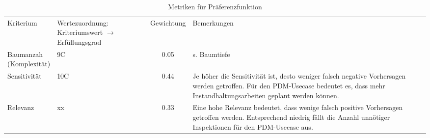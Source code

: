 \begin{table}[ht]
	\raggedright
	\begin{tabularx}{\textwidth}{ | l | l | c | X|}
		\hline
		Kriterium & \thead{Wertezuordnung:\\Kriteriumswert\\ $\rightarrow$ Erfüllungsgrad} & Gewichtung & Bemerkungen \\ 
		\thead{Baumanzah\\(Komplexität)} & 9C & \num{0.05} & s. Baumtiefe\\ 
		\hline
		Sensitivität & 10C & \num{0.44} & Je höher die Sensitivität ist, desto weniger falsch negative Vorhersagen werden getroffen. Für den PDM-Usecase bedeutet es, dass mehr Instandhaltungsarbeiten geplant werden können. \\
		\hline
        Relevanz & xx & \num{0.33} & Eine hohe Relevanz bedeutet, dass wenige falsch positive Vorhersagen getroffen werden. Entsprechend niedrig fällt die Anzahl unnötiger Inspektionen für den PDM-Usecase aus.\\
	\end{tabularx}
	\caption{Metriken für Präferenzfunktion}%
	\label{tab:metriken_praeferenzfunktion}	%
\end{table}